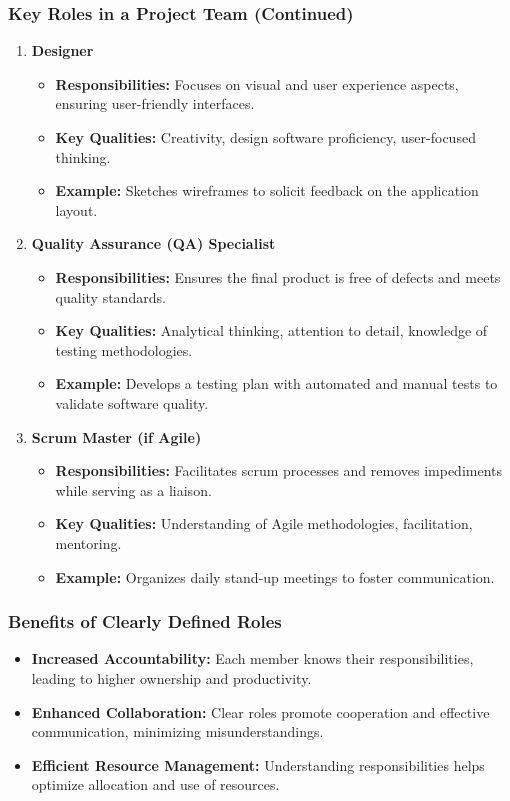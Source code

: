 \documentclass[aspectratio=169]{beamer}
\begin{document}
\begin{frame}[fragile]
    \frametitle{Key Roles in a Project Team (Continued)}
    \begin{enumerate}[resume]
        \item \textbf{Designer}
            \begin{itemize}
                \item \textbf{Responsibilities:} Focuses on visual and user experience aspects, ensuring user-friendly interfaces.
                \item \textbf{Key Qualities:} Creativity, design software proficiency, user-focused thinking.
                \item \textbf{Example:} Sketches wireframes to solicit feedback on the application layout.
            \end{itemize}

        \item \textbf{Quality Assurance (QA) Specialist}
            \begin{itemize}
                \item \textbf{Responsibilities:} Ensures the final product is free of defects and meets quality standards.
                \item \textbf{Key Qualities:} Analytical thinking, attention to detail, knowledge of testing methodologies.
                \item \textbf{Example:} Develops a testing plan with automated and manual tests to validate software quality.
            \end{itemize}

        \item \textbf{Scrum Master (if Agile)}
            \begin{itemize}
                \item \textbf{Responsibilities:} Facilitates scrum processes and removes impediments while serving as a liaison.
                \item \textbf{Key Qualities:} Understanding of Agile methodologies, facilitation, mentoring.
                \item \textbf{Example:} Organizes daily stand-up meetings to foster communication.
            \end{itemize}
    \end{enumerate}
\end{frame}

\begin{frame}[fragile]
    \frametitle{Benefits of Clearly Defined Roles}
    \begin{itemize}
        \item \textbf{Increased Accountability:} Each member knows their responsibilities, leading to higher ownership and productivity.
        \item \textbf{Enhanced Collaboration:} Clear roles promote cooperation and effective communication, minimizing misunderstandings.
        \item \textbf{Efficient Resource Management:} Understanding responsibilities helps optimize allocation and use of resources.
    \end{itemize}
\end{frame}
\end{document}
